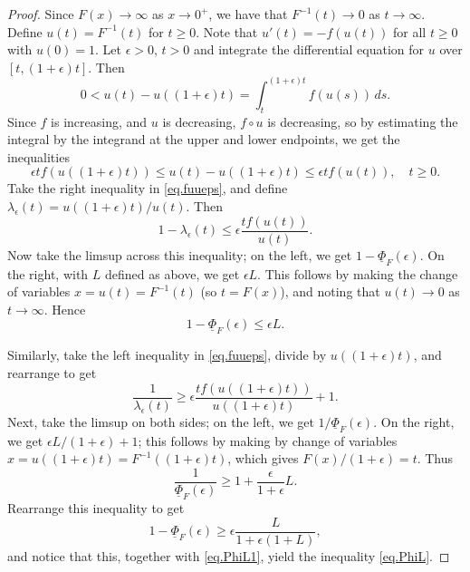 \documentclass[a4paper,10pt,reqno]{amsart}
\numberwithin{equation}{section}
\theoremstyle{definition}
\theoremstyle{remark}
\DeclareMathOperator{\1}{\mathbbm 1}
\begin{document}
	\begin{proof} 
		Since $F(x)\to \infty$ as $x\to 0^+$, we have that $F^{-1}(t)\to 0$ as $t\to\infty$. Define $u(t)=F^{-1}(t)$ for $t\geq 0$. Note that $u'(t)=-f(u(t))$ for all $t\geq 0$ with $u(0)=1$. Let $\epsilon>0$, $t>0$ and integrate the differential equation for $u$ over $[t,(1+\epsilon)t]$. Then 
		\[
		0<u(t)-u((1+\epsilon)t) = \int_t^{(1+\epsilon)t} f(u(s))\,ds.
		\]	
		Since $f$ is increasing, and $u$ is decreasing, $f\circ u$ is decreasing, so by estimating the integral by the integrand at the upper and lower endpoints, we get the inequalities 
		\begin{equation}  \label{eq.fuueps}
			\epsilon t f(u((1+\epsilon)t))\leq u(t)-u((1+\epsilon)t) \leq \epsilon t f(u(t)), \quad t\geq 0.
		\end{equation}
		Take the right inequality in \eqref{eq.fuueps}, and define $\lambda_\epsilon(t)=u((1+\epsilon)t)/u(t)$. Then 
		\begin{equation} \label{eq.lam1}
			1-\lambda_\epsilon(t)\leq \epsilon \frac{tf(u(t))}{u(t)}.
		\end{equation}
		Now take the limsup across this inequality; on the left, we get 
		$1-\underline{\Phi}_F(\epsilon)$. On the right, with $L$ defined as above, we get $\epsilon L$. This follows by making the change of variables $x=u(t)=F^{-1}(t)$ (so $t=F(x)$), and noting that $u(t)\to 0$ as $t\to\infty$. Hence 
		\begin{equation} \label{eq.PhiL1}
			1-\underline{\Phi}_F(\epsilon)\leq \epsilon L.
		\end{equation}
		
		Similarly, take the left inequality in \eqref{eq.fuueps}, divide by $u((1+\epsilon)t)$, and rearrange to get  
		\begin{equation} \label{eq.lam2}
			\frac{1}{\lambda_\epsilon(t)}\geq 	\epsilon \frac{t f(u((1+\epsilon)t))}{u((1+\epsilon)t)}+1.
		\end{equation}
		Next, take the limsup on both sides; on the left, we get $1/\underline{\Phi}_F(\epsilon)$. On the right, we get $\epsilon L/(1+\epsilon) +1$; this follows by making by change of variables $x=u((1+\epsilon)t)=F^{-1}((1+\epsilon)t)$, which gives $F(x)/(1+\epsilon)=t$. Thus 
		\begin{equation} \label{eq.PhiL2}
			\frac{1}{\underline{\Phi}_F(\epsilon)} \geq 1+\frac{\epsilon}{1+\epsilon} L.
		\end{equation}
		Rearrange this inequality to get 
		\[
		1-\underline{\Phi}_F(\epsilon) \geq \epsilon\frac{L}{1+\epsilon(1+ L)},
		\]
		and notice that this, together with \eqref{eq.PhiL1}, yield the inequality \eqref{eq.PhiL}.
		

\end{proof}
\end{document}
